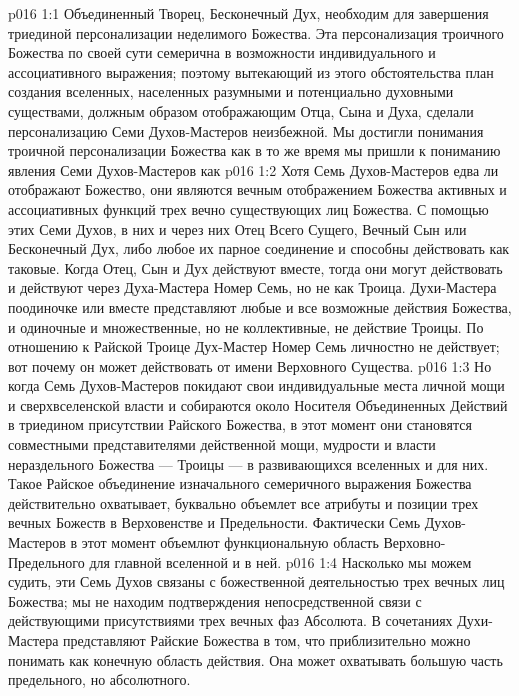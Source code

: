 \vs p016 1:1 Объединенный Творец, Бесконечный Дух, необходим для завершения триединой персонализации неделимого Божества. Эта персонализация троичного Божества по своей сути семерична в возможности индивидуального и ассоциативного выражения; поэтому вытекающий из этого обстоятельства план создания вселенных, населенных разумными и потенциально духовными существами, должным образом отображающим Отца, Сына и Духа, сделали персонализацию Семи Духов\hyp{}Мастеров неизбежной. Мы достигли понимания троичной персонализации Божества как  в то же время мы пришли к пониманию явления Семи Духов\hyp{}Мастеров как 
\vs p016 1:2 Хотя Семь Духов\hyp{}Мастеров едва ли отображают  Божество, они являются вечным отображением Божества  активных и ассоциативных функций трех вечно существующих лиц Божества. С помощью этих Семи Духов, в них и через них Отец Всего Сущего, Вечный Сын или Бесконечный Дух, либо любое их парное соединение и способны действовать как таковые. Когда Отец, Сын и Дух действуют вместе, тогда они могут действовать и действуют через Духа\hyp{}Мастера Номер Семь, но не как Троица. Духи\hyp{}Мастера поодиночке или вместе представляют любые и все возможные действия Божества, и одиночные и множественные, но не коллективные, не действие Троицы. По отношению к Райской Троице Дух\hyp{}Мастер Номер Семь личностно не действует; вот почему он может действовать  от имени Верховного Существа.
\vs p016 1:3 Но когда Семь Духов\hyp{}Мастеров покидают свои индивидуальные места личной мощи и сверхвселенской власти и собираются около Носителя Объединенных Действий в триедином присутствии Райского Божества, в этот момент они становятся совместными представителями действенной мощи, мудрости и власти нераздельного Божества --- Троицы --- в развивающихся вселенных и для них. Такое Райское объединение изначального семеричного выражения Божества действительно охватывает, буквально объемлет все атрибуты и позиции трех вечных Божеств в Верховенстве и Предельности. Фактически Семь Духов\hyp{}Мастеров в этот момент объемлют функциональную область Верховно\hyp{}Предельного для главной вселенной и в ней.
\vs p016 1:4 Насколько мы можем судить, эти Семь Духов связаны с божественной деятельностью трех вечных лиц Божества; мы не находим подтверждения непосредственной связи с действующими присутствиями трех вечных фаз Абсолюта. В сочетаниях Духи\hyp{}Мастера представляют Райские Божества в том, что приблизительно можно понимать как конечную область действия. Она может охватывать большую часть предельного, но  абсолютного.
